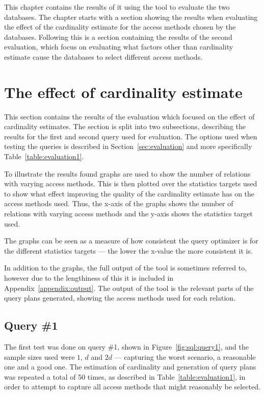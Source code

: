 This chapter contains the results of it using the tool to evaluate the two
databases. The chapter starts with a section showing the results when
evaluating the effect of the cardinality estimate for the access methods chosen
by the databases. Following this is a section containing the results of the
second evaluation, which focus on evaluating what factors other than cardinality
estimate cause the databases to select different access methods.

\section{The effect of cardinality estimate}\label{sec:correlation}
This section contains the results of the evaluation which focused on the effect of
cardinality estimates. The section is split into two subsections, describing the
results for the first and second query used for evaluation. The options used
when testing the queries is described in Section~\ref{sec:evaluation} and more
specifically Table~\ref{table:evaluation1}.

To illustrate the results found graphs are used to show the number of relations
with varying access methods. This is then plotted over the statistics
targets used to show what effect improving the quality of the cardinality
estimate has on the access methods used. Thus, the x-axis of the graphs shows
the number of relations with varying access methods and the y-axis shows the
statistics target used.

The graphs can be seen as a measure of how consistent the query optimizer is for
the different statistics targets --- the lower the x-value the more consistent
it is.

In addition to the graphs, the full output of the tool is sometimes referred to,
however due to the lengthiness of this it is included in
Appendix~\ref{appendix:output}. The output of the tool is the relevant parts
of the query plans generated, showing the access methods used for each relation.

\subsection{Query \#1}
The first test was done on query \#1, shown in Figure~\ref{fig:sql:query1}, and
the sample sizes used were $1$, $d$ and $2d$ --- capturing the worst scenario, a
reasonable one and a good one. The estimation of cardinality and generation of
query plans was repeated a total of 50 times, as described in
Table~\ref{table:evaluation1}, in order to attempt to capture all access methods
that might reasonably be selected.

